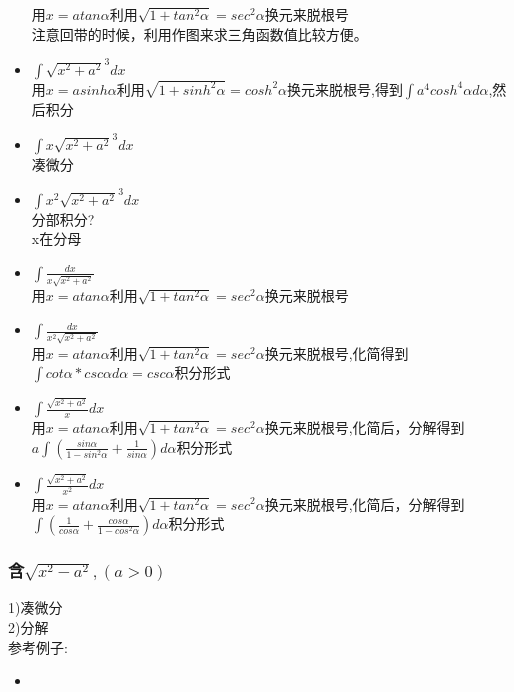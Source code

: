 \documentclass[fleqn]{article}
\begin{document}
\begin{flushleft}
\begin{itemize}
			用$x=atan\alpha$利用$\sqrt{1+tan^2\alpha}=sec^2\alpha$换元来脱根号\\
			注意回带的时候，利用作图来求三角函数值比较方便。\\
			\item $\int \sqrt{x^2+a^2}^3dx$\\
			用$x=asinh\alpha$利用$\sqrt{1+sinh^2 \alpha}=cosh^2\alpha$换元来脱根号,得到$\int a^4cosh^4\alpha d\alpha$,然后积分\\
			\item $\int x\sqrt{x^2+a^2}^3dx$\\
			凑微分\\
			\item $\int x^2\sqrt{x^2+a^2}^3dx$\\
			分部积分?\\
			x在分母\\
			\item $\int \frac{dx}{x\sqrt{x^2+a^2}}$\\
			用$x=atan\alpha$利用$\sqrt{1+tan^2\alpha}=sec^2\alpha$换元来脱根号\\
			\item $\int \frac{dx}{x^2\sqrt{x^2+a^2}}$\\
			用$x=atan\alpha$利用$\sqrt{1+tan^2\alpha}=sec^2\alpha$换元来脱根号,化简得到$\int cot\alpha*csc\alpha d\alpha=csc\alpha$积分形式\\
		\item $\int \frac{\sqrt{x^2+a^2}}{x}dx$\\
			用$x=atan\alpha$利用$\sqrt{1+tan^2\alpha}=sec^2\alpha$换元来脱根号,化简后，分解得到$a\int (\frac{sin\alpha}{1-sin^2\alpha}+\frac{1}{sin\alpha})d\alpha$积分形式\\
		\item $\int \frac{\sqrt{x^2+a^2}}{x^2}dx$\\
			用$x=atan\alpha$利用$\sqrt{1+tan^2\alpha}=sec^2\alpha$换元来脱根号,化简后，分解得到$\int (\frac{1}{cos\alpha}+\frac{cos\alpha}{1-cos^2\alpha})d\alpha$积分形式\\
		\end{itemize}
		\subsubsection{含$\sqrt{x^2-a^2},(a>0)$}
		1)凑微分\\
		2)分解\\
		参考例子:\\
		\begin{itemize}
				\item 
		\end{itemize}

\end{flushleft}
\end{document}
